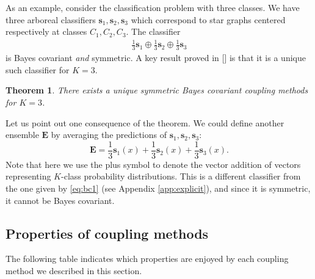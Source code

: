 \documentclass[twoside,11pt]{article}
\newtheorem{thm}{Theorem}
\begin{document}
As an example, consider the classification problem with three classes. We have three arboreal classifiers $\boldsymbol{s}_1, \boldsymbol{s}_2, \boldsymbol{s}_3$ which correspond to star graphs centered respectively at classes $C_1, C_2, C_3$. The classifier 
\begin{align}
\frac13 \boldsymbol{s}_1 \oplus \frac13 \boldsymbol{s}_2 \oplus \frac 13 \boldsymbol{s}_3  \label{eq:bc1}
\end{align}
is Bayes covariant \emph{and} symmetric. A key result proved in [\cite{vsuch2016bayes}] is that it is a unique such classifier for $K=3$.

\begin{thm} \label{thm:K3}
	There exists a unique symmetric Bayes covariant coupling methods for $K=3$.
\end{thm}

Let us point out one consequence of the theorem. We could define another ensemble $\boldsymbol{E}$ by averaging the predictions of $\boldsymbol{s}_1, \boldsymbol{s}_2, \boldsymbol{s}_3$:
\[
\boldsymbol{E} = \frac13 \boldsymbol{s}_1(x) + \frac13 \boldsymbol{s}_2(x) + \frac 13 \boldsymbol{s}_3(x).
\]
Note that here we use the plus symbol to denote the vector addition of vectors representing $K$-class probability distributions. This is a different classifier from the one given by  \eqref{eq:bc1} (see Appendix \ref{app:explicit}), and since it is symmetric, it cannot be Bayes covariant.

\subsection{Properties of coupling methods}


The following table indicates which properties are enjoyed by each coupling method we described in this section.
\end{document}
